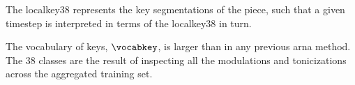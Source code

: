 
The \gls{localkey38} represents the key segmentations of the
piece, such that a given timestep is interpreted in terms of
the \gls{localkey38} in turn. 

The vocabulary of keys, $\vocabkey$, is larger than in any
previous \gls{arna} method. The 38 classes are the result of
inspecting all the modulations and tonicizations across the
aggregated training set.

